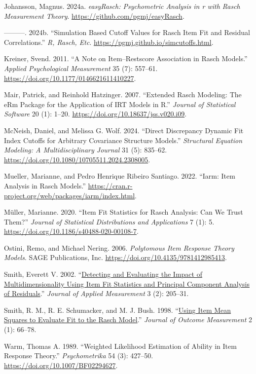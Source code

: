 \documentclass[
  letterpaper,
  DIV=11,
  numbers=noendperiod]{scrartcl}
\newlength{\cslhangindent}
\newenvironment{CSLReferences}[2] %
 {\begin{list}{}{%
  \setlength{\itemindent}{0pt}
  \setlength{\leftmargin}{0pt}
  \setlength{\parsep}{0pt}
  \ifodd #1
   \setlength{\leftmargin}{\cslhangindent}
   \setlength{\itemindent}{-1\cslhangindent}
  \fi
  \setlength{\itemsep}{#2\baselineskip}}}
 {\end{list}}
\begin{document}
\begin{CSLReferences}{1}{0}
Johansson, Magnus. 2024a. \emph{easyRasch: Psychometric Analysis in r
with Rasch Measurement Theory}. \url{https://github.com/pgmj/easyRasch}.

---------. 2024b. {``Simulation Based Cutoff Values for {Rasch} Item Fit
and Residual Correlations.''} \emph{R, Rasch, Etc}.
\url{https://pgmj.github.io/simcutoffs.html}.

Kreiner, Svend. 2011. {``A {Note} on {Item}--{Restscore} {Association}
in {Rasch} {Models}.''} \emph{Applied Psychological Measurement} 35 (7):
557--61. \url{https://doi.org/10.1177/0146621611410227}.

Mair, Patrick, and Reinhold Hatzinger. 2007. {``Extended {Rasch}
{Modeling}: {The} {eRm} {Package} for the {Application} of {IRT}
{Models} in {R}.''} \emph{Journal of Statistical Software} 20 (1):
1--20. \url{https://doi.org/10.18637/jss.v020.i09}.

McNeish, Daniel, and Melissa G. Wolf. 2024. {``Direct {Discrepancy}
{Dynamic} {Fit} {Index} {Cutoffs} for {Arbitrary} {Covariance}
{Structure} {Models}.''} \emph{Structural Equation Modeling: A
Multidisciplinary Journal} 31 (5): 835--62.
\url{https://doi.org/10.1080/10705511.2024.2308005}.

Mueller, Marianne, and Pedro Henrique Ribeiro Santiago. 2022. {``Iarm:
{Item} {Analysis} in {Rasch} {Models}.''}
\url{https://cran.r-project.org/web/packages/iarm/index.html}.

Müller, Marianne. 2020. {``Item Fit Statistics for {Rasch} Analysis: Can
We Trust Them?''} \emph{Journal of Statistical Distributions and
Applications} 7 (1): 5.
\url{https://doi.org/10.1186/s40488-020-00108-7}.

Ostini, Remo, and Michael Nering. 2006. \emph{Polytomous {Item}
{Response} {Theory} {Models}}. SAGE Publications, Inc.
\url{https://doi.org/10.4135/9781412985413}.

Smith, Everett V. 2002.
{``\href{https://www.ncbi.nlm.nih.gov/pubmed/12011501}{Detecting and
Evaluating the Impact of Multidimensionality Using Item Fit Statistics
and Principal Component Analysis of Residuals}.''} \emph{Journal of
Applied Measurement} 3 (2): 205--31.

Smith, R. M., R. E. Schumacker, and M. J. Bush. 1998.
{``\href{https://www.ncbi.nlm.nih.gov/pubmed/9661732}{Using Item Mean
Squares to Evaluate Fit to the {Rasch} Model}.''} \emph{Journal of
Outcome Measurement} 2 (1): 66--78.

Warm, Thomas A. 1989. {``Weighted Likelihood Estimation of Ability in
Item Response Theory.''} \emph{Psychometrika} 54 (3): 427--50.
\url{https://doi.org/10.1007/BF02294627}.

\end{CSLReferences}
\end{document}
